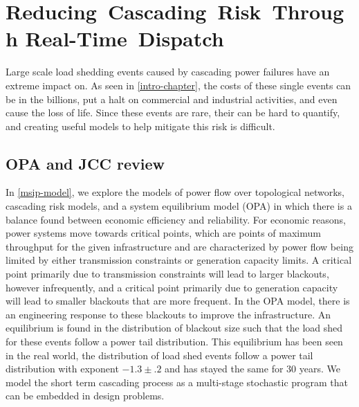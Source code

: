 \newcommand{\mypathoj}{../thesis/oj}

\newcommand{\mypathojdata}{../thesis/oj/data}
\newcommand{\alert}[1]{#1}
\chapter{Reducing~Cascading~Risk~Through  Real-Time~Dispatch}\label{ch:jccow}

Large scale load shedding events caused by cascading power failures have an extreme impact on.  As seen in \cref{intro-chapter}, the costs of these single events can be in the billions, put a halt on commercial and industrial activities, and even cause the loss of life.  Since these events are rare, their can be hard to quantify, and creating useful models to help mitigate this risk is difficult.

\section{OPA and JCC review}
In \cref{msip-model}, we explore the models of power flow over topological networks, cascading risk models, and a system equilibrium model (OPA) in which there is a balance found between economic efficiency and reliability.  For economic reasons, power systems move towards critical points, which are points of maximum throughput for the given infrastructure and are characterized by power flow being limited by either transmission constraints or generation capacity limits.  A critical point primarily due to transmission constraints will lead to larger blackouts, however infrequently, and a critical point primarily due to generation capacity will lead to smaller blackouts that are more frequent.  In the OPA model, there is an engineering response to these blackouts to improve the infrastructure.  An equilibrium is found in the distribution of blackout size such that the load shed for these events follow a power tail distribution.  This equilibrium has been seen in the real world, the distribution of load shed events follow a power tail distribution with exponent $-1.3 \pm .2$ and has stayed the same for 30 years.  We model the short term cascading process as a multi-stage stochastic program that can be embedded in design problems.

